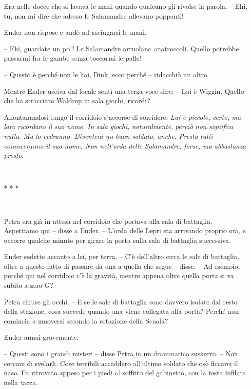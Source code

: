 {Era nelle docce che si lavava le mani quando qualcuno gli rivolse la
	parola. -- Ehi, tu, non mi dire che adesso le Salamandre allevano
	poppanti!}

{Ender non rispose e andò ad asciugarsi le mani.}

{-- Ehi, guardate un po'! Le Salamandre arruolano anatroccoli. Quello
	potrebbe passarmi fra le gambe senza toccarmi le palle!}

{-- Questo è perché non le hai, Dink, ecco perché -- ridacchiò un
	altro.}

{Mentre Ender usciva dal locale sentì una terza voce dire: -- Lui è
	Wiggin. Quello che ha stracciato Waldrop in sala giochi, ricordi?}

{Allontanandosi lungo il corridoio s'accorse di sorridere. \emph{Lui è
		piccolo, certo, ma loro ricordano il suo nome. In sala giochi,
		naturalmente, perciò non significa nulla. Ma lo vedranno. Diventerà un
		buon soldato, anche. Presto tutti conosceranno il suo nome. Non
		nell'orda delle Salamandre, forse, ma abbastanza presto.}}

{~}

\begin{center}
	{* * *}
\end{center}

{~}

{Petra era già in attesa nel corridoio che portava alla sala di
	battaglia. -- Aspettiamo qui -- disse a Ender. -- L'orda delle Lepri sta
	arrivando proprio ora, e occorre qualche minuto per girare la porta
	sulla sala di battaglia successiva.}

{Ender sedette accanto a lei, per terra. -- C'è dell'altro circa le sale
	di battaglia, oltre a questo fatto di passare da una a quella che segue
	-- disse. -- Ad esempio, perché qui nel corridoio c'è la gravità, mentre
	appena oltre quella porta si va subito a zero-G?}

{Petra chiuse gli occhi. -- E se le sale di battaglia sono davvero
	isolate dal resto della stazione, cosa succede quando una viene
	collegata alla porta? Perché non comincia a muoversi secondo la
	rotazione della Scuola?}

{Ender annuì gravemente.}

{-- Questi sono i grandi misteri -- disse Petra in un drammatico
	sussurro. -- Non cercare di svelarli. Cose terribili accaddero
	all'ultimo soldato che osò ficcarci il naso. Fu ritrovato appeso per i
	piedi al soffitto del gabinetto, con la testa infilata nella tazza.}

